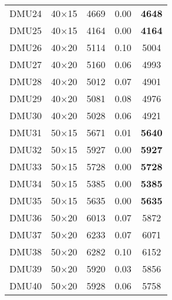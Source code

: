 \begin{table}[H]
\begin{tabular}{@{}ccccc@{}}
DMU24 & 40$\times$15 & 4669 & 0.00 & \textbf{4648}\\ 
DMU25 & 40$\times$15 & 4164 & 0.00 & \textbf{4164}\\ 
DMU26 & 40$\times$20 & 5114 & 0.10 & 5004\\ 
DMU27 & 40$\times$20 & 5160 & 0.06 & 4993\\ 
DMU28 & 40$\times$20 & 5012 & 0.07 & 4901\\ 
DMU29 & 40$\times$20 & 5081 & 0.08 & 4976\\ 
DMU30 & 40$\times$20 & 5028 & 0.06 & 4921\\ 
DMU31 & 50$\times$15 & 5671 & 0.01 & \textbf{5640}\\ 
DMU32 & 50$\times$15 & 5927 & 0.00 & \textbf{5927}\\ 
DMU33 & 50$\times$15 & 5728 & 0.00 & \textbf{5728}\\ 
DMU34 & 50$\times$15 & 5385 & 0.00 & \textbf{5385}\\ 
DMU35 & 50$\times$15 & 5635 & 0.00 & \textbf{5635}\\ 
DMU36 & 50$\times$20 & 6013 & 0.07 & 5872\\ 
DMU37 & 50$\times$20 & 6233 & 0.07 & 6071\\ 
DMU38 & 50$\times$20 & 6282 & 0.10 & 6152\\ 
DMU39 & 50$\times$20 & 5920 & 0.03 & 5856\\ 
DMU40 & 50$\times$20 & 5928 & 0.06 & 5758\\ \bottomrule
\end{tabular}
\end{table}

